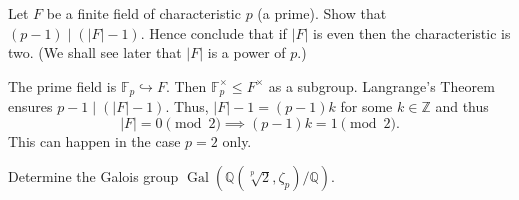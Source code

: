 \setcounter{pb}{21}
\begin{problem}
Let $F$ be a finite field of characteristic $p$ (a prime). Show that $(p - 1) \mid (|F| - 1)$. Hence conclude that if $|F|$ is even then the characteristic is two. (We shall see later that $|F|$ is a power of $p$.)
\end{problem}

\begin{solution}
    The prime field is $\mathbb{F}_{p}\hookrightarrow F$. Then $\mathbb{F}_{p}^{\times}\leq F^{\times}$ as a subgroup. Langrange's Theorem ensures $p-1\mid(|F|-1)$. 
    Thus, $|F|-1=(p-1)k$ for some $k\in\mathbb{Z}$ and thus 
        \[
            |F|=0\pmod 2\implies (p-1)k=1\pmod2.
        \]
    This can happen in the case $p=2$ only.
\end{solution}


    

\setcounter{pb}{26}
\begin{problem}
    Determine the Galois group $ \operatorname{Gal}(\mathbb{Q}(\sqrt[p]{2}, \zeta_p)/\mathbb{Q}) $.
\end{problem}

